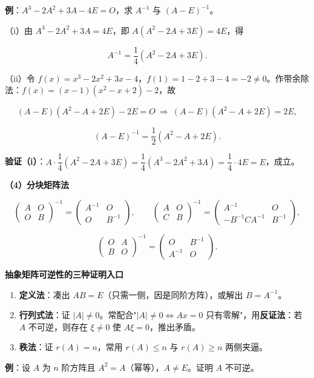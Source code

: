 \documentclass[11pt,openany,UTF8]{ctexbook}
\begin{document}
\textbf{例}：$A^3-2A^2+3A-4E=O$，求 $A^{-1}$ 与 $(A-E)^{-1}$。

（i）由 $A^3-2A^2+3A=4E$，即 $A(A^2-2A+3E)=4E$，得

\[A^{-1}=\frac{1}{4}(A^2-2A+3E).\]

（ii）令 $f(x)=x^3-2x^2+3x-4$，$f(1)=1-2+3-4=-2\ne0$。作带余除法：$f(x)=(x-1)(x^2-x+2)-2$，故

\[(A-E)(A^2-A+2E)-2E=O\ \Longrightarrow\ (A-E)(A^2-A+2E)=2E,\]

\[(A-E)^{-1}=\frac{1}{2}(A^2-A+2E).\]

\textbf{验证（i）}：$A\cdot\dfrac14(A^2-2A+3E)=\dfrac14(A^3-2A^2+3A)=\dfrac14\cdot4E=E$，成立。

\textbf{（4）分块矩阵法}

\[\begin{pmatrix}A&O\\O&B\end{pmatrix}^{-1}=\begin{pmatrix}A^{-1}&O\\O&B^{-1}\end{pmatrix},\qquad \begin{pmatrix}A&O\\C&B\end{pmatrix}^{-1}=\begin{pmatrix}A^{-1}&O\\-B^{-1}CA^{-1}&B^{-1}\end{pmatrix},\]

\[\begin{pmatrix}O&A\\B&O\end{pmatrix}^{-1}=\begin{pmatrix}O&B^{-1}\\A^{-1}&O\end{pmatrix}.\]

\textbf{抽象矩阵可逆性的三种证明入口}

\begin{enumerate}
\item \textbf{定义法}：凑出 $AB=E$（只需一侧，因是同阶方阵），或解出 $B=A^{-1}$。
\item \textbf{行列式法}：证 $\vert A\vert\ne0$。常配合"$\vert A\vert\ne0\iff Ax=0$ 只有零解"，用\textbf{反证法}：若 $A$ 不可逆，则存在 $\xi\ne0$ 使 $A\xi=0$，推出矛盾。
\item \textbf{秩法}：证 $r(A)=n$，常用 $r(A)\le n$ 与 $r(A)\ge n$ 两侧夹逼。
\end{enumerate}
\textbf{例}：设 $A$ 为 $n$ 阶方阵且 $A^2=A$（幂等），$A\ne E$。证明 $A$ 不可逆。
\end{document}
